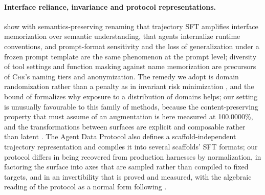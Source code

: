 \documentclass{article} %
\newcommand{\chr}{\textsc{Chr}}
\newcommand{\rtacc}{100.0000\%}           %
\begin{document}
\paragraph{Interface reliance, invariance and protocol representations.}
\citet{gu2026interfaces} show with semantics-preserving renaming that
trajectory SFT amplifies interface memorization over semantic understanding,
\citet{may2026runtime} that agents internalize runtime conventions, and
prompt-format sensitivity \citep{sclar2023sensitivity} and the loss of
generalization under a frozen prompt template \citep{lin2025debunk} are the
same phenomenon at the prompt level; diversity of tool settings
\citep{he2025gentool} and function masking against name memorization
\citep{lin2024hammer} are precursors of \chr{}'s naming tiers and
anonymization. The remedy we adopt is domain randomization
\citep{tobin2017domain} rather than a penalty as in invariant risk
minimization \citep{arjovsky2019irm}, and the bound of \citet{benda2010theory}
formalizes why exposure to a distribution of domains helps; our setting is
unusually favourable to this family of methods, because the content-preserving
property that \citet{kugelgen2021self} must assume of an augmentation is here
measured at \rtacc{}, and the transformations between surfaces are explicit
and composable rather than latent \citep{higgins2018symmetry}. The Agent Data
Protocol \citep{song2025adp} also defines a scaffold-independent trajectory
representation and compiles it into several scaffolds' SFT formats; our
protocol differs in being recovered from production harnesses by
normalization, in factoring the surface into axes that are sampled rather than
compiled to fixed targets, and in an invertibility that is proved and
measured, with the algebraic reading of the protocol as a normal form
following \citet{allen2019analogies}.
\end{document}
